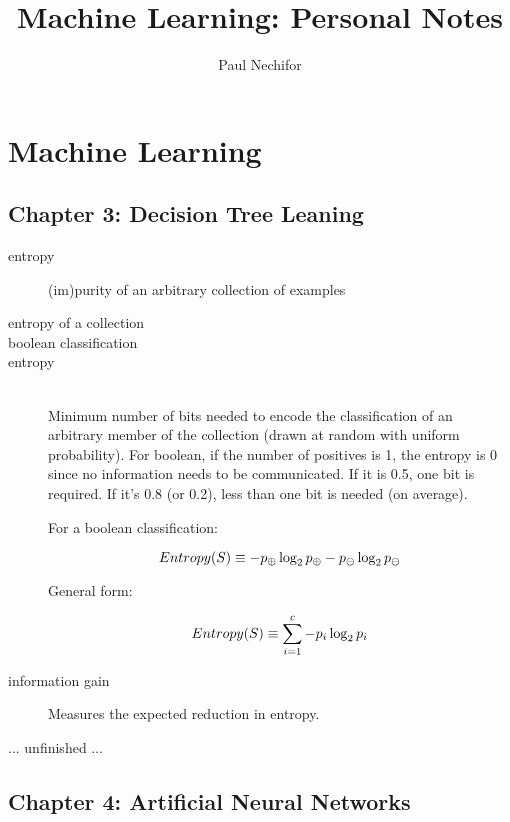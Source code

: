 \documentclass[12pt]{article}
\title{Machine Learning: Personal Notes}
\author{Paul Nechifor}
\newcommand{\hitem}[1][default] {
    \item[#1] \hfill \\
}
\begin{document}
\maketitle

\section{Machine Learning}

\subsection{Chapter 3: Decision Tree Leaning}

\begin{description}

\item[entropy] (im)purity of an arbitrary collection of examples

\item[entropy of a collection]

\item[boolean classification]

\hitem[entropy]
Minimum number of bits needed to encode the classification of an arbitrary
member of the collection (drawn at random with uniform probability). For
boolean, if the number of positives is 1, the entropy is 0 since no information
needs to be communicated. If it is 0.5, one bit is required. If it's 0.8 (or
0.2), less than one bit is needed (on average).

For a boolean classification:

\begin{equation}
    Entropy(S) \equiv -p_\oplus \log_2 p_\oplus - p_\ominus \log_2 p_\ominus
    \notag
\end{equation}

General form:

\begin{equation}
    Entropy(S) \equiv \sum\limits_{i=1}^c -p_i \log_2 p_i
    \notag
\end{equation}

\item[information gain] Measures the expected reduction in entropy.

\end{description}

... unfinished ...

\subsection{Chapter 4: Artificial Neural Networks}
\end{document}
